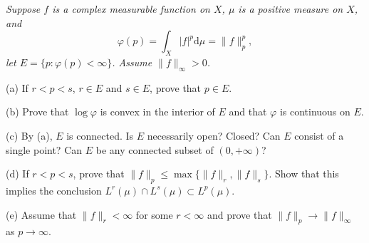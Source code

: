 \begin{problem}\em
Suppose $f$ is a complex measurable function on $X$, $\mu$ is a positive measure on $X$, and 
$$\varphi(p)=\int_X|f|^p\mathrm{d}\mu=\|f\|_p^p,$$
let $E=\{p:\varphi(p)<\infty\}$. Assume $\|f\|_\infty>0$.\par
(a) If $r<p<s$, $r\in E$ and $s\in E$, prove that $p\in E$.\par
(b) Prove that $\log\varphi$ is convex in the interior of $E$ and that $\varphi$ is continuous on $E$.\par
(c) By (a), $E$ is connected. Is $E$ necessarily open? Closed? Can $E$ consist of a single point? Can $E$ be any connected subset of $(0,+\infty)$?\par
(d) If $r<p<s$, prove that $\|f\|_p\le\max\{\|f\|_r,\|f\|_s\}$. Show that this implies the conclusion $L^r(\mu)\cap L^s(\mu)\subset L^p(\mu)$.\par
(e) Assume that $\|f\|_r<\infty$ for some $r<\infty$ and prove that $\|f\|_p\to\|f\|_\infty$ as $p\to\infty$.
\end{problem}

